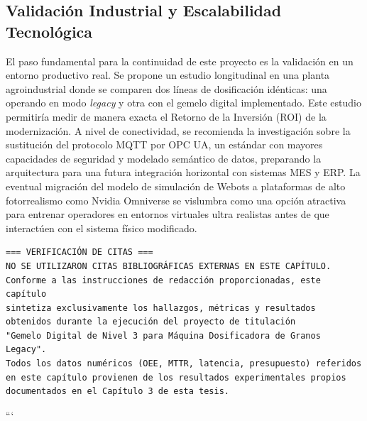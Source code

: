 \subsection{Validación Industrial y Escalabilidad Tecnológica}
El paso fundamental para la continuidad de este proyecto es la validación en un entorno productivo real. Se propone un estudio longitudinal en una planta agroindustrial donde se comparen dos líneas de dosificación idénticas: una operando en modo \textit{legacy} y otra con el gemelo digital implementado. Este estudio permitiría medir de manera exacta el Retorno de la Inversión (ROI) de la modernización. A nivel de conectividad, se recomienda la investigación sobre la sustitución del protocolo MQTT por OPC UA, un estándar con mayores capacidades de seguridad y modelado semántico de datos, preparando la arquitectura para una futura integración horizontal con sistemas MES y ERP. La eventual migración del modelo de simulación de Webots a plataformas de alto fotorrealismo como Nvidia Omniverse se vislumbra como una opción atractiva para entrenar operadores en entornos virtuales ultra realistas antes de que interactúen con el sistema físico modificado.

\begin{verbatim}
=== VERIFICACIÓN DE CITAS ===
NO SE UTILIZARON CITAS BIBLIOGRÁFICAS EXTERNAS EN ESTE CAPÍTULO.
Conforme a las instrucciones de redacción proporcionadas, este capítulo 
sintetiza exclusivamente los hallazgos, métricas y resultados 
obtenidos durante la ejecución del proyecto de titulación 
"Gemelo Digital de Nivel 3 para Máquina Dosificadora de Granos Legacy".
Todos los datos numéricos (OEE, MTTR, latencia, presupuesto) referidos 
en este capítulo provienen de los resultados experimentales propios 
documentados en el Capítulo 3 de esta tesis.
\end{verbatim}
```